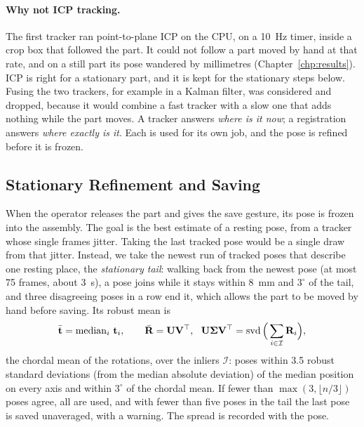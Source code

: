 \paragraph{Why not ICP tracking.} The first tracker ran point-to-plane ICP on the CPU, on a 10~Hz
timer, inside a crop box that followed the part. It could not follow a part moved by hand at that
rate, and on a still part its pose wandered by millimetres (Chapter~\ref{chp:results}).
 ICP is right for a stationary part, and it is kept for
the stationary steps below. Fusing the two trackers, for example in a Kalman filter, was considered
and dropped, because it would combine a fast tracker with a slow one that adds nothing while the part
moves. A tracker answers \emph{where is it now}; a registration answers \emph{where exactly is it}.
Each is used for its own job, and the pose is refined before it is frozen.

\subsection{Stationary Refinement and Saving}
\label{sec:per_stationary}
When the operator releases the part and gives the save gesture, its pose is frozen into the
assembly. The goal is the best estimate of a resting pose, from a tracker whose single frames
jitter. Taking the last tracked pose would be a single draw from that jitter. Instead, we take the
newest run of tracked poses that describe one resting place, the \emph{stationary tail}: walking back
from the newest pose (at most 75 frames, about 3~s), a pose joins while it stays within 8~mm and
$3^\circ$ of the tail, and three disagreeing poses in a row end it, which allows the part to be moved
by hand before saving. Its robust mean is
\begin{equation}
\bar{\vect{t}}=\operatorname{median}_i\,\vect{t}_i,\qquad
\bar{\mathbf{R}}=\mathbf{U}\mathbf{V}^{\top},\ \ \mathbf{U}\boldsymbol{\Sigma}\mathbf{V}^{\top}=\operatorname{svd}\Big(\sum_{i\in\mathcal{I}}\mathbf{R}_i\Big),
\label{eq:pose_mean}
\end{equation}
the chordal mean of the rotations, over the inliers $\mathcal{I}$: poses within 3.5 robust standard
deviations (from the median absolute deviation) of the median position on every axis and within
$3^\circ$ of the chordal mean. If fewer than $\max(3,\lfloor n/3\rfloor)$ poses agree, all are used,
and with fewer than five poses in the tail the last pose is saved unaveraged, with a warning. The
spread is recorded with the pose.

